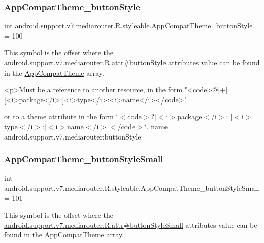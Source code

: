 \subsubsection{\texorpdfstring{App\+Compat\+Theme\+\_\+button\+Style}{AppCompatTheme\_buttonStyle}}
{\footnotesize\ttfamily int android.\+support.\+v7.\+mediarouter.\+R.\+styleable.\+App\+Compat\+Theme\+\_\+button\+Style = 100\hspace{0.3cm}{\ttfamily [static]}}

This symbol is the offset where the \hyperlink{classandroid_1_1support_1_1v7_1_1mediarouter_1_1R_1_1attr_a3104a420f7d9779d4be5ae4155378c1e}{android.\+support.\+v7.\+mediarouter.\+R.\+attr\#button\+Style} attribute\textquotesingle{}s value can be found in the \hyperlink{classandroid_1_1support_1_1v7_1_1mediarouter_1_1R_1_1styleable_a4e3d3900c75d49aeb2f283cac00214d6}{App\+Compat\+Theme} array.

\begin{DoxyVerb}      <p>Must be a reference to another resource, in the form "<code>@[+][<i>package</i>:]<i>type</i>:<i>name</i></code>"
\end{DoxyVerb}
 or to a theme attribute in the form \char`\"{}$<$code$>$?\mbox{[}$<$i$>$package$<$/i$>$\+:\mbox{]}\mbox{[}$<$i$>$type$<$/i$>$\+:\mbox{]}$<$i$>$name$<$/i$>$$<$/code$>$\char`\"{}.  name android.\+support.\+v7.\+mediarouter\+:button\+Style \mbox{\label{classandroid_1_1support_1_1v7_1_1mediarouter_1_1R_1_1styleable_aec6eece48285252661fdccd6314fc69a}} 
\subsubsection{\texorpdfstring{App\+Compat\+Theme\+\_\+button\+Style\+Small}{AppCompatTheme\_buttonStyleSmall}}
{\footnotesize\ttfamily int android.\+support.\+v7.\+mediarouter.\+R.\+styleable.\+App\+Compat\+Theme\+\_\+button\+Style\+Small = 101\hspace{0.3cm}{\ttfamily [static]}}

This symbol is the offset where the \hyperlink{classandroid_1_1support_1_1v7_1_1mediarouter_1_1R_1_1attr_ae5673ab51625b9587786678823cd5110}{android.\+support.\+v7.\+mediarouter.\+R.\+attr\#button\+Style\+Small} attribute\textquotesingle{}s value can be found in the \hyperlink{classandroid_1_1support_1_1v7_1_1mediarouter_1_1R_1_1styleable_a4e3d3900c75d49aeb2f283cac00214d6}{App\+Compat\+Theme} array.

